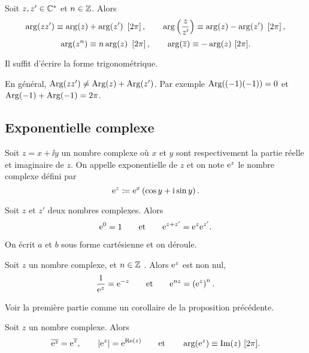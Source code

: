 \documentclass{magnoliaold}
\begin{document}
\begin{proposition}[utile=-3]
  Soit $z,z'\in\mathbb{C}^*$ et $n\in\mathbb{Z}$. Alors
  \[\arg(z z')\equiv\arg(z)+\arg(z')\ \left[2\pi\right], \qquad
    \arg\left(\frac{z}{z'}\right)\equiv\arg(z)-\arg(z')\ \left[2\pi\right],\]
  \[\arg(z^n)\equiv n\arg(z)\ \left[2\pi\right], \qquad
    \arg(\overline{z})\equiv -\arg(z)\ [2\pi].\]
\end{proposition}

\begin{preuve}
Il suffit d'écrire la forme trigonométrique.
\end{preuve}

\begin{remarqueUnique}
\remarque En général,
  $\operatorname{Arg}(z z')\neq\operatorname{Arg}(z)+\operatorname{Arg}(z')$. Par exemple $\operatorname{Arg}((-1)(-1))=0$ et $\operatorname{Arg}(-1)+\operatorname{Arg}(-1)=2\pi$.
\end{remarqueUnique}

\subsection{Exponentielle complexe}

\begin{definition}[utile=-3]
Soit $z=x+\ii y$ un nombre complexe où $x$ et $y$ sont respectivement la partie
réelle et imaginaire de $z$. On appelle exponentielle de $z$ et on note ${\rm e}^z$
le nombre complexe défini par
\[{\rm e}^z\coloneqq{\rm e}^{x}\left(\cos y +{\rm i} \sin y\right).\]
\end{definition}

\begin{proposition}[utile=-3]
Soit $z$ et $z'$ deux nombres complexes. Alors
\[{\rm e}^{0}=1 \qquad \text{et} \qquad {\rm e}^{z+z'}={\rm e}^{z} {\rm e}^{z'}.\]
\end{proposition}

\begin{preuve}
On écrit $a$ et $b$ sous forme cartésienne et on déroule.
\end{preuve}

\begin{proposition}[utile=-3]
Soit $z$ un nombre complexe, et $n\in\mathbb{Z}$ . Alors ${\rm e}^z$ est non nul,
\[\frac{1}{{\rm e}^z}={\rm e}^{-z} \qquad \text{et} \qquad {\rm e}^{nz}=\left({\rm e}^z\right)^n.\]
\end{proposition}

\begin{preuve}
Voir la première partie comme un corollaire de la proposition précédente. 
\end{preuve}

\begin{proposition}[utile=-3]
Soit $z$ un nombre complexe. Alors
\[\overline{{\rm e}^z}={\rm e}^{\overline{z}}, \qquad  \left|{\rm e}^z\right|={\rm e}^{\mathop{\rm Re}(z)}
\qquad \text{et} \qquad \arg({\rm e}^z)\equiv \mathop{\rm Im}(z)\ [2\pi].\]
\end{proposition}
\end{document}
